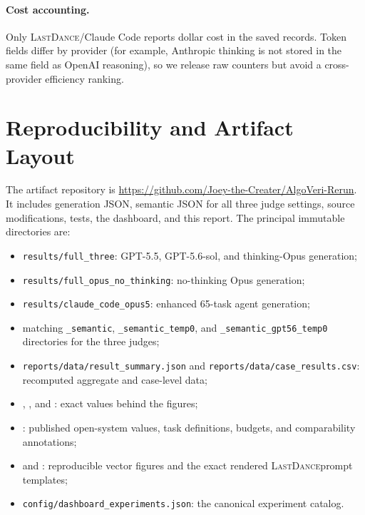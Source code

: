 \documentclass{article}
\newcommand{\artifact}{\url{https://github.com/Joey-the-Creater/AlgoVeri-Rerun}}
\newcommand{\lastdance}{\textsc{LastDance}}
\begin{document}
\paragraph{Cost accounting.}
Only \lastdance/Claude Code reports dollar cost in the saved records.  Token fields differ by
provider (for example, Anthropic thinking is not stored in the same field as OpenAI
reasoning), so we release raw counters but avoid a cross-provider efficiency ranking.

\section{Reproducibility and Artifact Layout}

The artifact repository is \artifact.  It includes generation JSON, semantic JSON for
all three judge settings, source modifications, tests, the dashboard, and this report.
The principal immutable directories are:

\begin{itemize}[leftmargin=*]
  \item \texttt{results/full\_three}: GPT-5.5, GPT-5.6-sol, and thinking-Opus generation;
  \item \texttt{results/full\_opus\_no\_thinking}: no-thinking Opus generation;
  \item \texttt{results/claude\_code\_opus5}: enhanced 65-task agent generation;
  \item matching \texttt{\_semantic}, \texttt{\_semantic\_temp0}, and
        \texttt{\_semantic\_gpt56\_temp0} directories for the three judges;
  \item \texttt{reports/data/result\_summary.json} and
        \texttt{reports/data/case\_results.csv}: recomputed aggregate and case-level data;
  \item {},
        , and
        : exact values behind the figures;
  \item {}: published open-system values,
        task definitions, budgets, and comparability annotations;
  \item {} and : reproducible vector figures
        and the exact rendered \lastdance prompt templates;
  \item \texttt{config/dashboard\_experiments.json}: the canonical experiment catalog.
\end{itemize}
\end{document}
